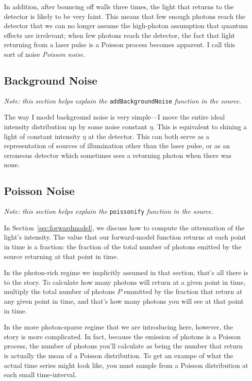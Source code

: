 \documentclass[11pt]{article}
\begin{document}
In addition, after bouncing off walls three times, the light that returns to the detector is likely to be very faint. This means that few enough photons reach the detector that we can no longer assume the high-photon assumption that quantum effects are irrelevant; when few photons reach the detector, the fact that light returning from a laser pulse is a Poisson process becomes apparent. I call this sort of noise \emph{Poisson noise}.

\subsection{Background Noise}

\emph{Note: this section helps explain the} \texttt{addBackgroundNoise} \emph{function in the source.}

The way I model background noise is very simple---I move the entire ideal intensity distribution up by some noise constant $\eta$. This is equivalent to shining a light of constant intensity $\eta$ at the detector. This can both serve as a representation of sources of illumination other than the laser pulse, or as an erroneous detector which sometimes sees a returning photon when there was none.

\subsection{Poisson Noise}

\emph{Note: this section helps explain the} \texttt{poissonify} \emph{function in the source.}

In Section~\ref{sec:forwardmodel}, we discuss how to compute the attenuation of the light's intensity. The value that our forward-model function returns at each point in time is a fraction: the fraction of the total number of photons emitted by the source returning at that point in time.

In the photon-rich regime we implicitly assumed in that section, that's all there is to the story. To calculate how many photons will return at a given point in time, multiply the total number of photons $P$ emmitted by the fraction that return at any given point in time, and that's how many photons you will see at that point in time. 

In the more photon-sparse regime that we are introducing here, however, the story is more complicated. In fact, because the emission of photons is a Poisson process, the number of photons you'll calculate as being the number that return is actually the mean of a Poisson distribution. To get an exampe of what the actual time series might look like, you must sample from a Poisson distribution at each small time-interval.
\end{document}
